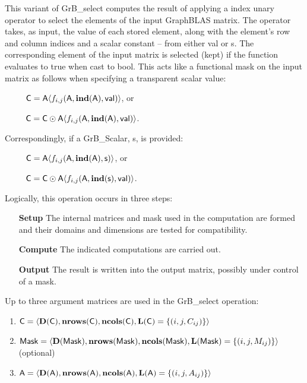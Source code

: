This variant of {\sf GrB\_select} computes the result of applying a index unary operator
to select the elements of the input GraphBLAS matrix.  The operator takes, as input,
the value of each stored element, along with the element's row and column indices and a scalar 
constant -- from either {\sf val} or {\sf s}.  The corresponding element of the input matrix is selected (kept)
if the function evaluates to {\sf true} when cast to {\sf bool}.  This acts like a
functional mask on the input matrix as follows when specifying a transparent scalar value:
\begin{itemize}[leftmargin=2.1in]
\item[~] ${\sf C} = {\sf A}\langle f_{i,j}({\sf A}, \bold{ind}({\sf A}), {\sf val})\rangle$, or
\item[~] ${\sf C} = {\sf C} \odot {\sf A}\langle f_{i,j}({\sf A}, \bold{ind}({\sf A}), {\sf val})\rangle$.  
\end{itemize}
{\color{red}
Correspondingly, if a {\sf GrB\_Scalar}, {\sf s}, is provided:
\begin{itemize}[leftmargin=2.1in]
\item[~] ${\sf C} = {\sf A}\langle f_{i,j}({\sf A}, \bold{ind}({\sf A}), {\sf s})\rangle$, or
\item[~] ${\sf C} = {\sf C} \odot {\sf A}\langle f_{i,j}({\sf A}, \bold{ind}({\sf s}), {\sf val})\rangle$.  
\end{itemize}
}

Logically, this operation occurs in three steps:
\begin{enumerate}[leftmargin=0.85in]
\item[\bf Setup] The internal matrices and mask used in the computation are formed 
and their domains and dimensions are tested for compatibility.
\item[\bf Compute] The indicated computations are carried out.
\item[\bf Output] The result is written into the output matrix, possibly under 
control of a mask.
\end{enumerate}

Up to three argument matrices are used in the {\sf GrB\_select} operation:
\begin{enumerate}
    \item ${\sf C} = \langle \bold{D}({\sf C}),\bold{nrows}({\sf C}),
    \bold{ncols}({\sf C}),\bold{L}({\sf C}) = \{(i,j,C_{ij}) \} \rangle$

    \item ${\sf Mask} = \langle \bold{D}({\sf Mask}),\bold{nrows}({\sf Mask}),
    \bold{ncols}({\sf Mask}),\bold{L}({\sf Mask}) = \{(i,j,M_{ij}) \} \rangle$ (optional)

    \item ${\sf A} = \langle \bold{D}({\sf A}),\bold{nrows}({\sf A}),
    \bold{ncols}({\sf A}),\bold{L}({\sf A}) = \{(i,j,A_{ij}) \} \rangle$
\end{enumerate}

